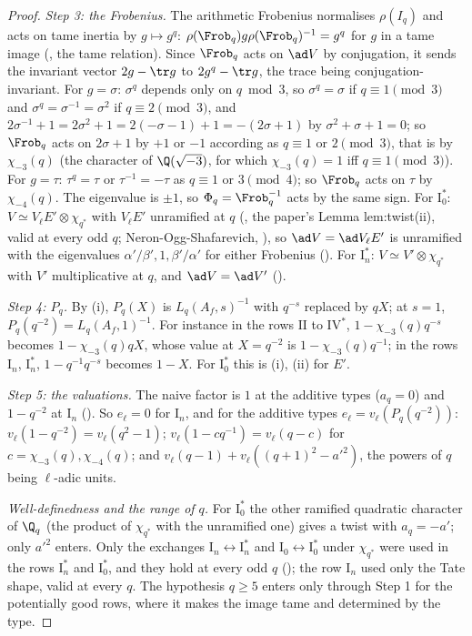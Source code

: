 \begin{proof}
\emph{Step 3: the Frobenius.} The arithmetic Frobenius normalises $\rho(I_q)$ and acts on tame inertia by $g\mapsto g^q$: $\rho(\Frob_q)g\rho(\Frob_q)^{-1}=g^q$ for $g$ in a tame image
(, the tame relation). Since $\Frob_q$ acts on $\ad V$ by conjugation, it sends the invariant vector $2g-\tr g$ to $2g^q-\tr g$, the trace being
conjugation-invariant. For $g=\sigma$: $\sigma^q$ depends only on $q\bmod3$, so $\sigma^q=\sigma$ if $q\equiv1\pmod3$ and $\sigma^q=\sigma^{-1}=\sigma^2$ if $q\equiv2\pmod3$, and
$2\sigma^{-1}+1=2\sigma^2+1=2(-\sigma-1)+1=-(2\sigma+1)$ by $\sigma^2+\sigma+1=0$; so $\Frob_q$ acts on $2\sigma+1$ by $+1$ or $-1$ according as $q\equiv1$ or $2\pmod3$, that is by
$\chi_{-3}(q)$ (the character of $\Q(\sqrt{-3})$, for which $\chi_{-3}(q)=1$ iff $q\equiv1\pmod3$). For $g=\tau$: $\tau^q=\tau$ or $\tau^{-1}=-\tau$ as $q\equiv1$ or $3\pmod4$; so $\Frob_q$ acts on $\tau$ by $\chi_{-4}(q)$. The eigenvalue is $\pm1$, so
$\Phi_q=\Frob_q^{-1}$ acts by the same sign. For $\mathrm I_0^*$: $V\simeq V_\ell E'\otimes\chi_{q^*}$ with $V_\ell E'$ unramified at $q$ (, the paper's Lemma lem:twist(ii),
valid at every odd $q$; Neron-Ogg-Shafarevich, ), so $\ad V=\ad V_\ell E'$ is unramified with the eigenvalues $\alpha'/\beta',1,\beta'/\alpha'$ for either Frobenius
(). For $\mathrm I_n^*$: $V\simeq V'\otimes\chi_{q^*}$ with $V'$ multiplicative at $q$, and $\ad V=\ad V'$ ().

\emph{Step 4: $P_q$.} By (i), $P_q(X)$ is $L_q(A_f,s)^{-1}$ with $q^{-s}$ replaced by $qX$; at $s=1$, $P_q(q^{-2})=L_q(A_f,1)^{-1}$. For instance in the
rows $\mathrm{II}$ to $\mathrm{IV}^*$, $1-\chi_{-3}(q)q^{-s}$ becomes $1-\chi_{-3}(q)qX$, whose value at $X=q^{-2}$ is $1-\chi_{-3}(q)q^{-1}$; in the rows $\mathrm I_n$, $\mathrm I_n^*$,
$1-q^{-1}q^{-s}$ becomes $1-X$. For $\mathrm I_0^*$ this is (i), (ii) for $E'$.

\emph{Step 5: the valuations.} The naive factor is $1$ at the additive types ($a_q=0$) and $1-q^{-2}$ at $\mathrm I_n$ (). So $e_\ell=0$ for $\mathrm I_n$, and
for the additive types $e_\ell=v_\ell(P_q(q^{-2}))$: $v_\ell(1-q^{-2})=v_\ell(q^2-1)$; $v_\ell(1-cq^{-1})=v_\ell(q-c)$ for $c=\chi_{-3}(q),\chi_{-4}(q)$; and
$v_\ell(q-1)+v_\ell((q+1)^2-a'^2)$, the powers of $q$ being $\ell$-adic units.

\emph{Well-definedness and the range of $q$.} For $\mathrm I_0^*$ the other ramified quadratic character of $\Q_q$ (the product of $\chi_{q^*}$ with the unramified one) gives a twist
with $a_q=-a'$; only $a'^2$ enters. Only the exchanges $\mathrm I_n\leftrightarrow\mathrm I_n^*$ and $\mathrm I_0\leftrightarrow\mathrm I_0^*$ under $\chi_{q^*}$ were used in the rows $\mathrm I_n^*$ and $\mathrm I_0^*$,
and they hold at every odd $q$ (); the row $\mathrm I_n$ used only the Tate shape, valid at every $q$. The hypothesis $q\ge5$ enters only through Step 1 for the
potentially good rows, where it makes the image tame and determined by the type.
\end{proof}

